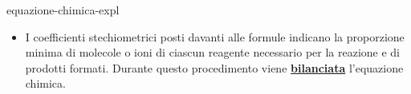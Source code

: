 \documentclass[preview]{standalone}
\begin{document}
\begin{snippet}{equazione-chimica-expl}
\begin{itemize}
        \item I coefficienti stechiometrici posti davanti alle formule indicano la proporzione minima
            di molecole o ioni di ciascun reagente necessario per la reazione e di prodotti formati.
            Durante questo procedimento viene \textbf{\underline{bilanciata}} l'equazione chimica. 
            \\
            \begin{center}
            \end{center}
    \end{itemize}
\end{snippet}
\end{document}
